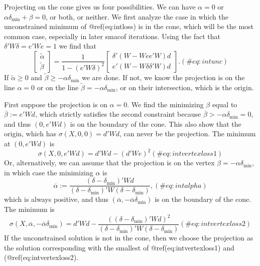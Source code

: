 \documentclass[
  12pt,
  letterpaper,
  DIV=11,
  numbers=noendperiod]{scrreprt}
\theoremstyle{remark}
\begin{document}
Projecting on the cone gives us four possibilities. We can have
\(\alpha=0\) or \(\alpha\delta_\text{min}+\beta=0\), or both, or
neither. We first analyze the case in which the unconstrained minimum of
@ref(eq:intloss) is in the cone, which will be the most common case,
especially in later smacof iterations. Using the fact that
\(\delta'W\delta=e'We=1\) we find that \begin{equation}
\begin{bmatrix}\tilde\alpha\\\tilde\beta\end{bmatrix}=
\frac{1}{1-(e'W\delta)^2}\begin{bmatrix}\delta'(W-We e'W)d\\e'(W-W\delta\delta'W)d\end{bmatrix}.
(\#eq:intunc)
\end{equation} If \(\tilde\alpha\geq 0\) and
\(\tilde\beta\geq-\alpha\delta_\text{min}\) we are done. If not, we know
the projection is on the line \(\alpha=0\) or on the line
\(\tilde\beta=-\alpha\delta_\text{min}\), or on their intersection,
which is the origin.

First suppose the projection is on \(\alpha=0\). We find the minimizing
\(\beta\) equal to \(\overline{\beta}:=e'Wd\), which strictly satisfies
the second constraint because
\(\overline\beta>-\alpha\delta_\text{min}=0\), and thus \((0,e'Wd)\) is
on the boundary of the cone. This also show that the origin, which has
\(\sigma(X,0,0)=d'Wd\), can never be the projection. The minimum at
\((0,e'Wd)\) is \begin{equation}
\sigma(X,0,e'Wd)=d'Wd-(d'We)^2
(\#eq:intvertexloss1)
\end{equation} Or, alternatively, we can assume that the projection is
on the vertex \(\beta=-\alpha\delta_\text{min}\), in which case the
minimizing \(\alpha\) is \begin{equation}
\overline{\alpha}:=\frac{(\delta-\delta_\text{min})'Wd}{(\delta-\delta_\text{min})'W(\delta-\delta_\text{min})},
(\#eq:intalpha)
\end{equation} which is always positive, and thus
\((\overline{\alpha},-\overline{\alpha}\delta_\text{min})\) is on the
boundary of the cone. The minimum is \begin{equation}
\sigma(X,\overline{\alpha},-\overline{\alpha}\delta_\text{min})=d'Wd-\frac{((\delta-\delta_\text{min})'Wd)^2}{(\delta-\delta_\text{min})'W(\delta-\delta_\text{min})}
(\#eq:intvertexloss2)
\end{equation} If the unconstrained solution is not in the cone, then we
choose the projection as the solution corresponding with the smallest of
@ref(eq:intvertexloss1) and (@ref(eq:intvertexloss2).
\end{document}
